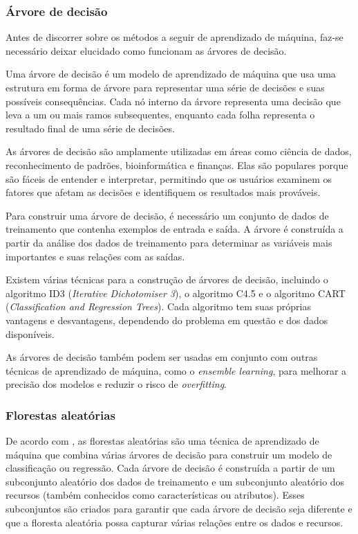 \subsubsection{Árvore de decisão}

Antes de discorrer sobre os métodos a seguir de aprendizado de máquina, faz-se necessário deixar elucidado como funcionam as árvores de decisão.

Uma árvore de decisão é um modelo de aprendizado de máquina que usa uma estrutura em forma de árvore para representar uma série de decisões e suas possíveis consequências. Cada nó interno da árvore representa uma decisão que leva a um ou mais ramos subsequentes, enquanto cada folha representa o resultado final de uma série de decisões.

As árvores de decisão são amplamente utilizadas em áreas como ciência de dados, reconhecimento de padrões, bioinformática e finanças. Elas são populares porque são fáceis de entender e interpretar, permitindo que os usuários examinem os fatores que afetam as decisões e identifiquem os resultados mais prováveis.

Para construir uma árvore de decisão, é necessário um conjunto de dados de treinamento que contenha exemplos de entrada e saída. A árvore é construída a partir da análise dos dados de treinamento para determinar as variáveis mais importantes e suas relações com as saídas.

Existem várias técnicas para a construção de árvores de decisão, incluindo o algoritmo ID3 (\textit{Iterative Dichotomiser 3}), o algoritmo C4.5 e o algoritmo CART (\textit{Classification and Regression Trees}). Cada algoritmo tem suas próprias vantagens e desvantagens, dependendo do problema em questão e dos dados disponíveis.

As árvores de decisão também podem ser usadas em conjunto com outras técnicas de aprendizado de máquina, como o \textit{ensemble learning}, para melhorar a precisão dos modelos e reduzir o risco de \textit{overfitting}.
\subsubsection{Florestas aleatórias}

De acordo com \cite{breiman2001random}, as florestas aleatórias são uma técnica de aprendizado de máquina que combina várias árvores de decisão para construir um modelo de classificação ou regressão. Cada árvore de decisão é construída a partir de um subconjunto aleatório dos dados de treinamento e um subconjunto aleatório dos recursos (também conhecidos como características ou atributos). Esses subconjuntos são criados para garantir que cada árvore de decisão seja diferente e que a floresta aleatória possa capturar várias relações entre os dados e recursos.

